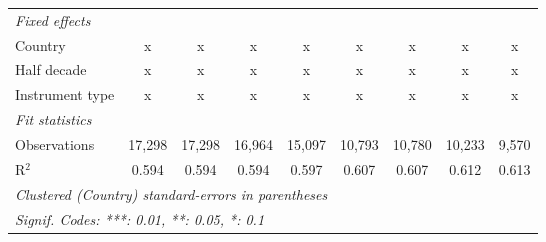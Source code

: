 \begin{tabular}{lcccccccc}
   \emph{Fixed effects}\\
   Country                                                    & x              & x              & x              & x             & x             & x             & x             & x\\  
   Half decade                                                & x              & x              & x              & x             & x             & x             & x             & x\\  
   Instrument type                                            & x              & x              & x              & x             & x             & x             & x             & x\\  
   \midrule \emph{Fit statistics}\\
   Observations                                               & 17,298         & 17,298         & 16,964         & 15,097        & 10,793        & 10,780        & 10,233        & 9,570\\  
   R$^2$                                                      & 0.594          & 0.594          & 0.594          & 0.597         & 0.607         & 0.607         & 0.612         & 0.613\\  
   \midrule
   \multicolumn{9}{l}{\emph{Clustered (Country) standard-errors in parentheses}}\\
   \multicolumn{9}{l}{\emph{Signif. Codes: ***: 0.01, **: 0.05, *: 0.1}}\\
\end{tabular}
\par\endgroup


